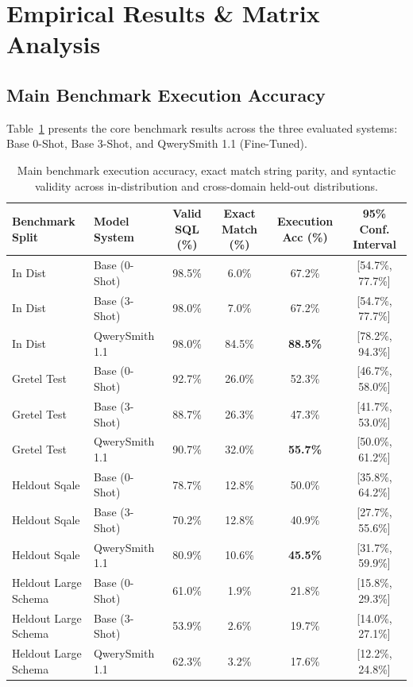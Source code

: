 \documentclass[10pt,twocolumn,letterpaper]{article}
\theoremstyle{definition}
\begin{document}
\section{Empirical Results \& Matrix Analysis}
\label{sec:results}

\subsection{Main Benchmark Execution Accuracy}
Table~\ref{tab:main_benchmark} presents the core benchmark results across the three evaluated systems: Base 0-Shot, Base 3-Shot, and QwerySmith 1.1 (Fine-Tuned).

\begin{table}[t]
\centering\small
\begin{tabular}{llcccc}
\toprule
\textbf{Benchmark Split} & \textbf{Model System} & \textbf{Valid SQL (\%)} & \textbf{Exact Match (\%)} & \textbf{Execution Acc (\%)} & \textbf{95\% Conf. Interval} \\
\midrule
In Dist & Base (0-Shot) & 98.5\% & 6.0\% & 67.2\% & [54.7\%, 77.7\%] \\
In Dist & Base (3-Shot) & 98.0\% & 7.0\% & 67.2\% & [54.7\%, 77.7\%] \\
In Dist & QwerySmith 1.1 & 98.0\% & 84.5\% & \textbf{88.5\%} & [78.2\%, 94.3\%] \\
\midrule
Gretel Test & Base (0-Shot) & 92.7\% & 26.0\% & 52.3\% & [46.7\%, 58.0\%] \\
Gretel Test & Base (3-Shot) & 88.7\% & 26.3\% & 47.3\% & [41.7\%, 53.0\%] \\
Gretel Test & QwerySmith 1.1 & 90.7\% & 32.0\% & \textbf{55.7\%} & [50.0\%, 61.2\%] \\
\midrule
Heldout Sqale & Base (0-Shot) & 78.7\% & 12.8\% & 50.0\% & [35.8\%, 64.2\%] \\
Heldout Sqale & Base (3-Shot) & 70.2\% & 12.8\% & 40.9\% & [27.7\%, 55.6\%] \\
Heldout Sqale & QwerySmith 1.1 & 80.9\% & 10.6\% & \textbf{45.5\%} & [31.7\%, 59.9\%] \\
\midrule
Heldout Large Schema & Base (0-Shot) & 61.0\% & 1.9\% & 21.8\% & [15.8\%, 29.3\%] \\
Heldout Large Schema & Base (3-Shot) & 53.9\% & 2.6\% & 19.7\% & [14.0\%, 27.1\%] \\
Heldout Large Schema & QwerySmith 1.1 & 62.3\% & 3.2\% & 17.6\% & [12.2\%, 24.8\%] \\
\bottomrule
\end{tabular}
\caption{Main benchmark execution accuracy, exact match string parity, and syntactic validity across in-distribution and cross-domain held-out distributions.}
\label{tab:main_benchmark}
\end{table}
\end{document}
